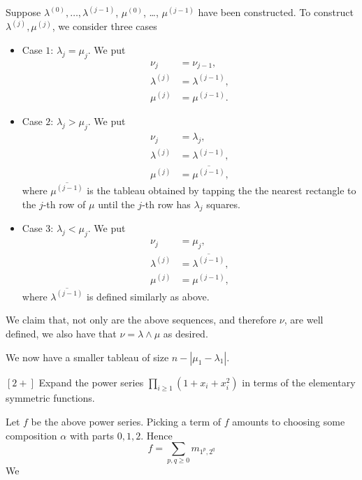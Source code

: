 \documentclass{article}
\begin{document}
Suppose $\lambda^{(0)}, \ldots, \lambda^{(j-1)}$, $\mu^{(0)}$, \ldots, $\mu^{(j-1)}$ have been constructed. 
To construct $\lambda^{(j)}, \mu^{(j)}$, we consider three cases
\begin{itemize}
    \item Case $1$: $\lambda_j = \mu_j$. We put 
        \begin{align*}
            \nu_j &= \nu_{j-1}, \\
            \lambda^{(j)} &= \lambda^{(j-1)}, \\
            \mu^{(j)} &= \mu^{(j-1)}.
        \end{align*}
    \item Case $2$: $\lambda_j > \mu_j$. We put 
        \begin{align*}
            \nu_j &= \lambda_j, \\
            \lambda^{(j)} &= \lambda^{(j-1)}, \\
            \mu^{(j)} &= \overline{\mu^{(j-1)}},
        \end{align*}
        where $\overline{\mu^{(j-1)}}$ is the tableau obtained by tapping the the nearest rectangle to the $j$-th row of $\mu$ until the $j$-th row has $\lambda_j$ squares.
    \item Case $3$: $\lambda_j < \mu_j$. We put 
        \begin{align*}
            \nu_j &= \mu_j, \\
            \lambda^{(j)} &= \overline{\lambda^{(j-1)}}, \\
            \mu^{(j)} &= \mu^{(j-1)},
        \end{align*}
        where $\overline{\lambda^{(j-1)}}$ is defined similarly as above.
\end{itemize}

We claim that, not only are the above sequences, and therefore $\nu$, are well defined, we also have that $\nu = \lambda \wedge \mu$ as desired.

We now have a smaller tableau of size $n - |\mu_1 - \lambda_1|$.


\begin{exercise}
    $[2+]$
    Expand the power series $\prod_{i\geq1}(1+x_i+x_i^2)$ in terms of the elementary symmetric functions.
\end{exercise}

Let $f$ be the above power series. 
Picking a term of $f$ amounts to choosing some composition $\alpha$ with parts $0,1,2$. Hence
\[
    f = \sum_{p,q \geq 0} m_{1^p,2^q}
\]
We 
\end{document}
